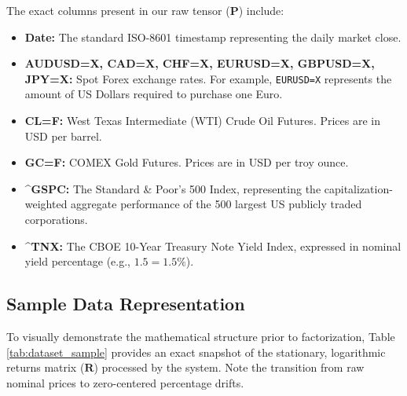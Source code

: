 \documentclass[12pt,twoside]{report}
\begin{document}
The exact columns present in our raw tensor ($\mathbf{P}$) include:
\begin{itemize}
    \item \textbf{Date:} The standard ISO-8601 timestamp representing the daily market close.
    \item \textbf{AUDUSD=X, CAD=X, CHF=X, EURUSD=X, GBPUSD=X, JPY=X:} Spot Forex exchange rates. For example, \texttt{EURUSD=X} represents the amount of US Dollars required to purchase one Euro.
    \item \textbf{CL=F:} West Texas Intermediate (WTI) Crude Oil Futures. Prices are in USD per barrel.
    \item \textbf{GC=F:} COMEX Gold Futures. Prices are in USD per troy ounce.
    \item \textbf{\^{}GSPC:} The Standard \& Poor's 500 Index, representing the capitalization-weighted aggregate performance of the 500 largest US publicly traded corporations.
    \item \textbf{\^{}TNX:} The CBOE 10-Year Treasury Note Yield Index, expressed in nominal yield percentage (e.g., $1.5 = 1.5\%$).
\end{itemize}

\subsection{Sample Data Representation}
To visually demonstrate the mathematical structure prior to factorization, Table \ref{tab:dataset_sample} provides an exact snapshot of the stationary, logarithmic returns matrix ($\mathbf{R}$) processed by the system. Note the transition from raw nominal prices to zero-centered percentage drifts.

\begin{table}[H]
\centering
{}
\caption{Empirical snapshot of the $I(0)$ stationary log-returns matrix ($\mathbf{R}$) extracted from \texttt{pca\_ready\_dataset.csv}.}
\label{tab:dataset_sample}
\end{table}
\end{document}
